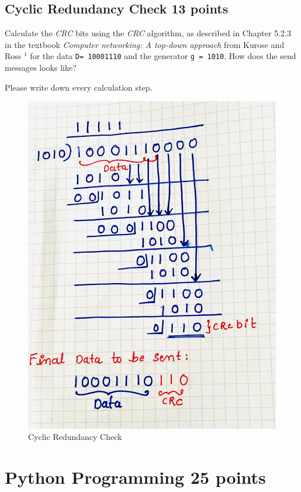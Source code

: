 \documentclass{resources/WeSTassignment}
\begin{document}
\subsection{Cyclic Redundancy Check \hfill{13 points}}
Calculate the \emph{CRC} bits using the \emph{CRC} algorithm, as described in Chapter 5.2.3 in the textbook \emph{Computer networking: A top-down approach} from Kurose and Ross $^1$  for the data \texttt{D= 10001110} and the generator \texttt{g = 1010}. How does the send messages looks like? 

Please write down every calculation step.

\begin{figure}[h!]
  \includegraphics[width=\linewidth]{resources/Solution2.jpeg}
  \caption{Cyclic Redundancy Check}
  \label{fig:cyclicRedundancyCheck}
\end{figure}

\section{Python Programming \hfill{25 points}}
\end{document}
